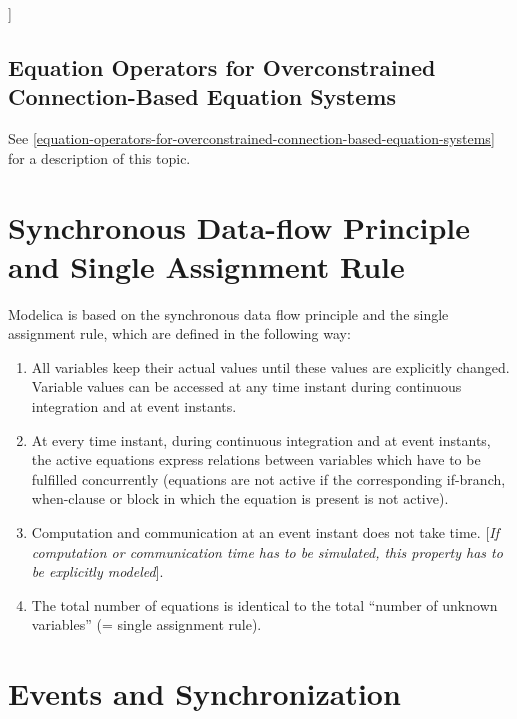 {]}

\subsection{Equation Operators for Overconstrained Connection-Based Equation Systems}

See \autoref{equation-operators-for-overconstrained-connection-based-equation-systems} for a description of this topic.

\section{Synchronous Data-flow Principle and Single Assignment Rule}

Modelica is based on the synchronous data flow principle and the single
assignment rule, which are defined in the following way:

\begin{enumerate}
\item All variables keep their actual values until these values are
explicitly changed. Variable values can be accessed at any time instant
during continuous integration and at event instants.

\item At every time instant, during continuous integration and at event
instants, the active equations express relations between variables which
have to be fulfilled concurrently (equations are not active if the
corresponding if-branch, when-clause or block in which the equation is
present is not active).

\item  Computation and communication at an event instant does not take time.
{[}\emph{If computation or communication time has to be simulated, this
property has to be explicitly modeled}{]}.

\item  The total number of equations is identical to the total ``number of
unknown variables'' (= single assignment rule).
\end{enumerate}

\section{Events and Synchronization}

